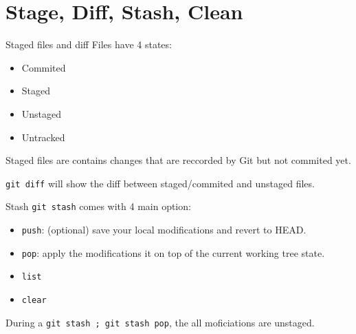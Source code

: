 \documentclass[usenames,dvipsnames,9pt]{beamer}
\begin{document}
\section{Stage, Diff, Stash, Clean}

%
\begin{frame}{Staged files and diff}
  Files have 4 states:
  \begin{itemize}
    \item Commited
    \item Staged
    \item Unstaged
    \item Untracked
  \end{itemize}
  Staged files are contains changes that are reccorded by Git but not commited yet.

  \lstinline|git diff| will show the diff between staged/commited and unstaged files.
\end{frame}

%
\begin{frame}{Stash}
  \lstinline|git stash| comes with 4 main option:
  \begin{itemize}
    \item \lstinline|push|: (optional) save your local modifications and revert to HEAD.
    \item \lstinline|pop|: apply the modifications it on top of the current working tree state.
    \item \lstinline|list|
    \item \lstinline|clear|
  \end{itemize}

  \vspace{0.5cm}
  During a \lstinline|git stash ; git stash pop|, the all moficiations are unstaged.
\end{frame}
\end{document}
